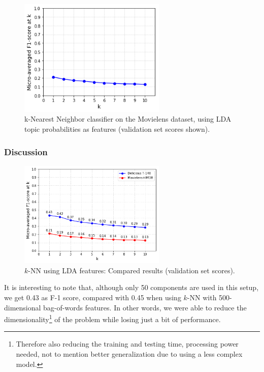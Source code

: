 \begin{figure}[H]
    \centering
    \includegraphics[width=7cm]{chapters/05_experiments/images/knn-lda-movielens.png}
    \caption{k-Nearest Neighbor classifier on the Movielens dataset, using LDA topic probabilities as features (validation set scores shown).}
    \label{fig:knn_lda_movielens}
\end{figure}

\subsubsection{Discussion}

\begin{figure}[H]
    \centering
    \includegraphics[width=7cm]{chapters/05_experiments/images/proposal-1-compared-knn-lda.png}
    \caption{$k$-NN using LDA features: Compared results (validation set scores).}
    \label{fig:compared_knn_lda}
\end{figure}

It is interesting to note that, although only 50 components are used in this setup, we get 0.43 as F-1 score, compared with 0.45 when using $k$-NN with 500-dimensional bag-of-words features. In other words, we were able to reduce the dimensionality\footnote{Therefore also reducing the training and testing time, processing power needed, not to mention better generalization due to using a less complex model.} of the problem while losing just a bit of performance.  

